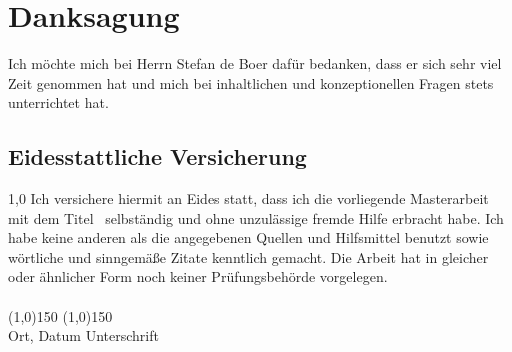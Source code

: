 \thispagestyle{empty}
\section*{Danksagung}
Ich möchte mich bei Herrn Stefan de Boer dafür bedanken, dass er sich sehr viel Zeit genommen hat und mich bei inhaltlichen und konzeptionellen Fragen stets
unterrichtet hat.
\newpage
\thispagestyle{empty}
\begin{center}
\section*{Eidesstattliche Versicherung}
\end{center}
\begin{spacing}{1,0}
\noindent
Ich versichere hiermit an Eides statt, dass ich die vorliegende Masterarbeit mit dem Titel \grqq \ selbst\"andig und ohne unzulässige fremde Hilfe erbracht habe. Ich habe keine anderen als die angegebenen
Quellen und Hilfsmittel benutzt sowie w\"ortliche und sinngem\"a\ss e Zitate kenntlich gemacht.
Die Arbeit hat in gleicher oder \"ahnlicher Form noch keiner Pr\"ufungsbeh\"orde vorgelegen.
\vspace*{1cm}
\ \\
\ \\
\line(1,0){150} \hfill \line(1,0){150}\\
Ort, Datum \hfill Unterschrift \hspace*{3cm}
\vspace*{1.5cm}


\end{spacing}
